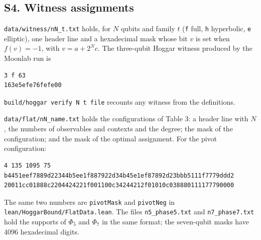 \documentclass[11pt,a4paper]{article}
\begin{document}
\subsection{S4. Witness assignments}\label{s4-witness-assignments}

\texttt{data/witness/nN\_t.txt} holds, for \(N\) qubits and family \(t\) (\texttt{f} full, \texttt{h} hyperbolic, \texttt{e} elliptic), one
header line and a hexadecimal mask whose bit \(v\) is set when \(f(v) = -1\), with \(v = a + 2^N c\). The
three-qubit Hoggar witness produced by the Moonlab run is

\begin{verbatim}
3 f 63
163e5efe76fefe00
\end{verbatim}

\texttt{build/hoggar\ verify\ N\ t\ file} recounts any witness from the definitions.

\texttt{data/flat/nN\_name.txt} holds the configurations of Table 3: a header line with \(N\), the numbers of
observables and contexts and the degree; the mask of the configuration; and the mask of the optimal
assignment. For the pivot configuration:

\begin{verbatim}
4 135 1095 75
b4451eef7889d22344b5ee1f887922d34b45e1ef87892d23bbb5111f7779ddd2
20011cc01888c2204424221f001100c34244212f01010c038880111177790000
\end{verbatim}

The same two numbers are \texttt{pivotMask} and \texttt{pivotNeg} in \texttt{lean/HoggarBound/FlatData.lean}. The files
\texttt{n5\_phase5.txt} and \texttt{n7\_phase7.txt} hold the supports of \(\Phi_5\) and \(\Phi_7\) in the same format; the
seven-qubit masks have 4096 hexadecimal digits.
\end{document}

